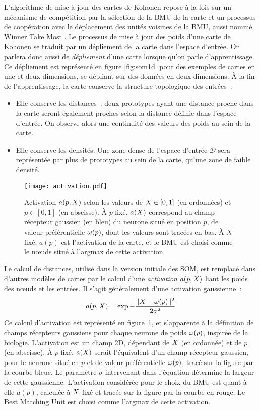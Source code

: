 \documentclass[../main]{subfiles}
\begin{document}
L'algorithme de mise à jour des cartes de Kohonen repose à la fois sur un mécanisme de compétition par la sélection de la BMU de la carte et un processus de coopération avec le déplacement des unités voisines de la BMU, aussi nommé \og Winner Take Most \fg{}.
Le processus de mise à jour des poids d'une carte de Kohonen se traduit par un dépliement de la carte dans l'espace d'entrée. On parlera donc aussi de \emph{dépliement} d'une carte lorsque qu'on parle d'apprentissage. Ce dépliement est représenté en figure \ref{fig:som1d} pour des exemples de cartes en une et deux dimensions, se dépliant sur des données en deux dimensions.
\`A la fin de l'apprentissage, la carte conserve la structure topologique des entrées~:
\begin{itemize}
\item Elle conserve les distances~: deux prototypes ayant une distance proche dans la carte seront également proches selon la distance définie dans l'espace d'entrée. On observe alors une continuité des valeurs des poids au sein de la carte.
\item Elle conserve les densités. Une zone dense de l'espace d'entrée $\mathcal{D}$ sera représentée par plus de prototypes au sein de la carte, qu'une zone de faible densité.
\end{itemize}

\begin{figure}
    \centering\texttt{[image: activation.pdf]}
    \caption{Activation $a(p, X)$ selon les valeurs de $X \in [0,1]$ (en ordonnées) et $p \in [0,1]$ (en abscisse). \`A  $p$ fixé, $a(X)$ correspond au champ récepteur gaussien (en bleu) du neurone situé en position $p$, de valeur préférentielle $\omega(p)$, dont les valeurs sont tracées en bas.
    \`A $X$ fixé, $a(p)$ est l'activation de la carte, et le BMU est choisi comme le n\oe{}uds situé à l'argmax de cette activation. \label{fig:activation}
    }
\end{figure}

Le calcul de distances, utilisé dans la version initiale des SOM, est remplacé dans d'autres modèles de cartes par le calcul d'une \emph{activation} $a(p, X)$ liant les poids des n\oe{}uds et les entrées. Il s'agit généralement d'une activation gaussienne~:
\begin{equation}\label{eq:activation}
    a(p, X) = \exp{-\frac{\lVert X- \omega(p)\rVert^2}{2\sigma^2}}
\end{equation}
Ce calcul d'activation est représenté en figure~\ref{fig:activation}, et s'apparente à la définition de champs récepteurs gaussiens pour chaque neurone de poids $\omega(p)$, inspirée de la biologie.
L'activation est un champ 2D, dépendant de $X$ (en ordonnée) et de $p$ (en abscisse). \`A $p$ fixé, $a(X)$ serait l'équivalent d'un champ récepteur gaussien, pour le neurone situé en $p$ et de valeur préférentielle $\omega(p)$, tracé sur la figure par la courbe bleue. Le paramètre $\sigma$ intervenant dans l'équation détermine la largeur de cette gaussienne.
L'activation considérée pour le choix du BMU est quant à elle $a(p)$, calculée à $X$ fixé et tracée sur la figure par la courbe en rouge. Le Best Matching Unit est choisi comme l'argmax de cette activation.
\end{document}
